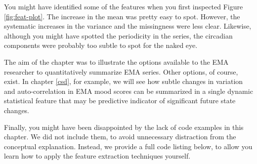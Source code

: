 \documentclass[]{book}
\begin{document}
You might have identified some of the features when you first inspected
Figure \ref{fig:feat-plot}. The increase in the mean was pretty easy to
spot. However, the systematic increases in the variance and the
missingness were less clear. Likewise, although you might have spotted
the periodicity in the series, the circadian components were probably
too subtle to spot for the naked eye.

The aim of the chapter was to illustrate the options available to the
EMA researcher to quantitatively summarize EMA series. Other options, of
course, exist. In chapter \ref{csd}, for example, we will see how subtle
changes in variation and auto-correlation in EMA mood scores can be
summarized in a single dynamic statistical feature that may be
predictive indicator of significant future state changes.

Finally, you might have been disappointed by the lack of code examples
in this chapter. We did not include them, to avoid unnecessary
distraction from the conceptual explanation. Instead, we provide a full
code listing below, to allow you learn how to apply the feature
extraction techniques yourself.

\end{document}

